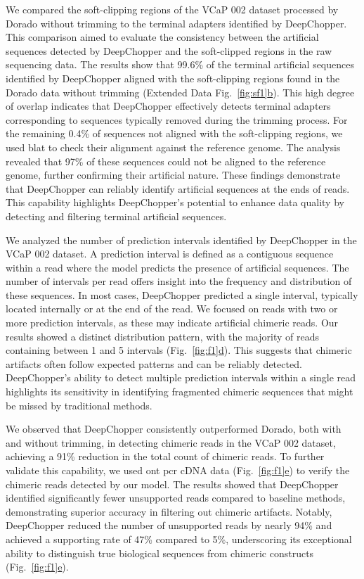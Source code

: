 \documentclass[pdflatex, sn-mathphys-num, lineno]{sn-jnl}%
\newcommand{\figref}[2]{Fig.~\hyperref[#1]{\ref*{#1}#2}}
\newcommand{\edfigref}[2]{Extended Data Fig.~\hyperref[#1]{\ref*{#1}#2}}
\theoremstyle{thmstyleone}%
\theoremstyle{thmstyletwo}%
\theoremstyle{thmstylethree}%
\begin{document}
We compared the soft-clipping regions of the VCaP 002 dataset processed by Dorado without trimming to the terminal adapters identified by DeepChopper.
This comparison aimed to evaluate the consistency between the artificial sequences detected by DeepChopper and the soft-clipped regions in the raw sequencing data.
The results show that 99.6\% of the terminal artificial sequences identified by DeepChopper aligned with the soft-clipping regions found in the Dorado data without trimming (\edfigref{fig:sf1}{b}).
This high degree of overlap indicates that DeepChopper effectively detects terminal adapters corresponding to sequences typically removed during the trimming process.
For the remaining 0.4\% of sequences not aligned with the soft-clipping regions, we used \gls{blat} to check their alignment against the reference genome.
The analysis revealed that 97\% of these sequences could not be aligned to the reference genome, further confirming their artificial nature.
These findings demonstrate that DeepChopper can reliably identify artificial sequences at the ends of reads.
This capability highlights DeepChopper's potential to enhance data quality by detecting and filtering terminal artificial sequences.


We analyzed the number of prediction intervals identified by DeepChopper in the VCaP 002 dataset.
A prediction interval is defined as a contiguous sequence within a read where the model predicts the presence of artificial sequences.
The number of intervals per read offers insight into the frequency and distribution of these sequences.
In most cases, DeepChopper predicted a single interval, typically located internally or at the end of the read.
We focused on reads with two or more prediction intervals, as these may indicate artificial chimeric reads.
Our results showed a distinct distribution pattern, with the majority of reads containing between 1 and 5 intervals (\figref{fig:f1}{d}).
This suggests that chimeric artifacts often follow expected patterns and can be reliably detected.
DeepChopper's ability to detect multiple prediction intervals within a single read highlights its sensitivity in identifying fragmented chimeric sequences that might be missed by traditional methods.


We observed that DeepChopper consistently outperformed Dorado, both with and without trimming, in detecting chimeric reads in the VCaP 002 dataset, achieving a 91\% reduction in the total count of chimeric reads.
To further validate this capability, we used \gls{ont} \gls{pcr} cDNA data (\figref{fig:f1}{e}) to verify the chimeric reads detected by our model.
The results showed that DeepChopper identified significantly fewer unsupported reads compared to baseline methods, demonstrating superior accuracy in filtering out chimeric artifacts.
Notably, DeepChopper reduced the number of unsupported reads by nearly 94\% and achieved a supporting rate of 47\% compared to 5\%, underscoring its exceptional ability to distinguish true biological sequences from chimeric constructs (\figref{fig:f1}{e}).
\end{document}
